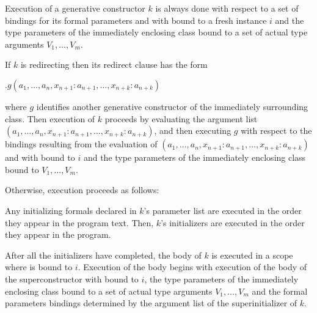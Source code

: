 \documentclass{article}
\newcommand{\code}[1]{{\sf #1}}
\begin{document}
\LMHash{}
Execution of a generative constructor $k$ is always done with respect to a set of bindings for its formal parameters and with  \THIS{} bound to a fresh instance $i$ and the type parameters of the immediately enclosing class bound to a set of actual type arguments $V_1, \ldots , V_m$.


\LMHash{}
If $k$ is redirecting then its redirect clause has the form

\THIS{}$.g(a_1, \ldots , a_n, x_{n+1}: a_{n+1}, \ldots , x_{n+k}: a_{n+k})$

where $g$ identifies another  generative constructor of the immediately surrounding class. Then execution of $k$ proceeds by evaluating the argument list $(a_1, \ldots , a_n, x_{n+1}: a_{n+1}, \ldots , x_{n+k}: a_{n+k})$, and then executing $g$ with respect to the bindings resulting from the evaluation of $(a_1, \ldots , a_n, x_{n+1}: a_{n+1}, \ldots , x_{n+k}: a_{n+k})$ and with  \THIS{} bound to $i$ and the type parameters of the immediately enclosing class bound to $V_1, \ldots , V_m$.

\LMHash{}
Otherwise, execution  proceeds as follows:

\LMHash{}
Any initializing formals declared in $k$'s parameter list are executed in the order they appear in the program text.
Then, $k$'s  initializers are executed in the order they appear in the program.


\LMHash{}
After all the initializers  have completed, the body of $k$ is executed  in a scope where \THIS{} is bound to $i$. Execution of the body begins with execution of the body of the superconstructor  with \THIS{} bound to $i$, the type parameters of the immediately enclosing class bound to a set of actual type arguments $V_1, \ldots , V_m$ and the formal parameters bindings determined by the argument list of the superinitializer of $k$.
\end{document}
